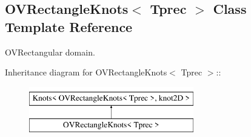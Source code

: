 \hypertarget{classOVRectangleKnots}{
\subsection{OVRectangleKnots$<$ Tprec $>$ Class Template Reference}
\label{classOVRectangleKnots}
}
OVRectangular domain.  


Inheritance diagram for OVRectangleKnots$<$ Tprec $>$::\begin{figure}[H]
\begin{center}
\leavevmode
\includegraphics[height=2cm]{classOVRectangleKnots}
\end{center}
\end{figure}
